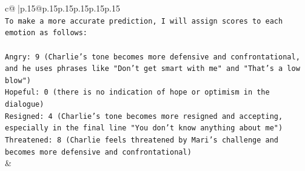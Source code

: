\documentclass{article}
\begin{document}
{\begin{supertabular}{c@{$\;$}|p{.15\linewidth}@{}p{.15\linewidth}p{.15\linewidth}p{.15\linewidth}p{.15\linewidth}p{.15\linewidth}}
{{{\\ 
\texttt{To make a more accurate prediction, I will assign scores to each emotion as follows:} \\
\\ 
\texttt{Angry: 9 (Charlie's tone becomes more defensive and confrontational, and he uses phrases like "Don't get smart with me" and "That's a low blow")} \\
\texttt{Hopeful: 0 (there is no indication of hope or optimism in the dialogue)} \\
\texttt{Resigned: 4 (Charlie's tone becomes more resigned and accepting, especially in the final line "You don't know anything about me")} \\
\texttt{Threatened: 8 (Charlie feels threatened by Mari's challenge and becomes more defensive and confrontational)} \\
            }
        }
    }
    & \\ \\

\end{supertabular}
}
\end{document}
